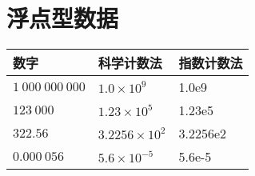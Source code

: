 \section{浮点型数据}

\begin{frame}
\begin{table}
\centering
\begin{tabular}{lll} \hline
数字&科学计数法&指数计数法\\\hline
$1~000~000~000$ & $1.0\times 10^9$ & 1.0e9\\ 
$123~000$ & $1.23\times10^5$ & 1.23e5\\
$322.56$ & $3.2256\times10^2$ & 3.2256e2\\
$0.000~056$ & $5.6\times10^{-5}$ & 5.6e-5\\\hline
\end{tabular}
\end{table}
\end{frame}


